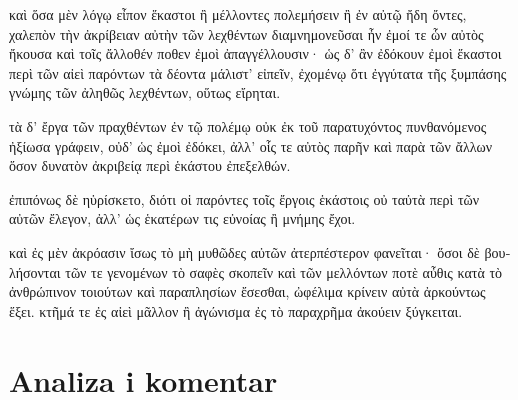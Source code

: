 {\large

\begin{greek}

\noindent καὶ ὅσα μὲν λόγῳ εἶπον ἕκαστοι ἢ μέλλοντες πολεμήσειν ἢ ἐν αὐτῷ ἤδη ὄντες, χαλεπὸν τὴν ἀκρίβειαν αὐτὴν τῶν λεχθέντων διαμνημονεῦσαι ἦν ἐμοί τε ὧν αὐτὸς ἤκουσα καὶ τοῖς ἄλλοθέν ποθεν ἐμοὶ ἀπαγγέλλουσιν· ὡς δ' ἂν ἐδόκουν ἐμοὶ ἕκαστοι περὶ τῶν αἰεὶ παρόντων τὰ δέοντα μάλιστ' εἰπεῖν, ἐχομένῳ ὅτι ἐγγύτατα τῆς ξυμπάσης γνώμης τῶν ἀληθῶς λεχθέντων, οὕτως εἴρηται.

\noindent τὰ δ' ἔργα τῶν πραχθέντων ἐν τῷ πολέμῳ οὐκ ἐκ τοῦ παρατυχόντος πυνθανόμενος ἠξίωσα γράφειν, οὐδ' ὡς ἐμοὶ ἐδόκει, ἀλλ' οἷς τε αὐτὸς παρῆν καὶ παρὰ τῶν ἄλλων ὅσον δυνατὸν ἀκριβείᾳ περὶ ἑκάστου ἐπεξελθών.

\noindent ἐπιπόνως δὲ ηὑρίσκετο, διότι οἱ παρόντες τοῖς ἔργοις ἑκάστοις οὐ ταὐτὰ περὶ τῶν αὐτῶν ἔλεγον, ἀλλ' ὡς ἑκατέρων τις εὐνοίας ἢ μνήμης ἔχοι.

\noindent καὶ ἐς μὲν ἀκρόασιν ἴσως τὸ μὴ μυθῶδες αὐτῶν ἀτερπέστερον φανεῖται· ὅσοι δὲ βουλήσονται τῶν τε γενομένων τὸ σαφὲς σκοπεῖν καὶ τῶν μελλόντων ποτὲ αὖθις κατὰ τὸ ἀνθρώπινον τοιούτων καὶ παραπλησίων ἔσεσθαι, ὠφέλιμα κρίνειν αὐτὰ ἀρκούντως ἕξει. κτῆμά τε ἐς αἰεὶ μᾶλλον ἢ ἀγώνισμα ἐς τὸ παραχρῆμα ἀκούειν ξύγκειται.

\end{greek}

}


\section*{Analiza i komentar}


